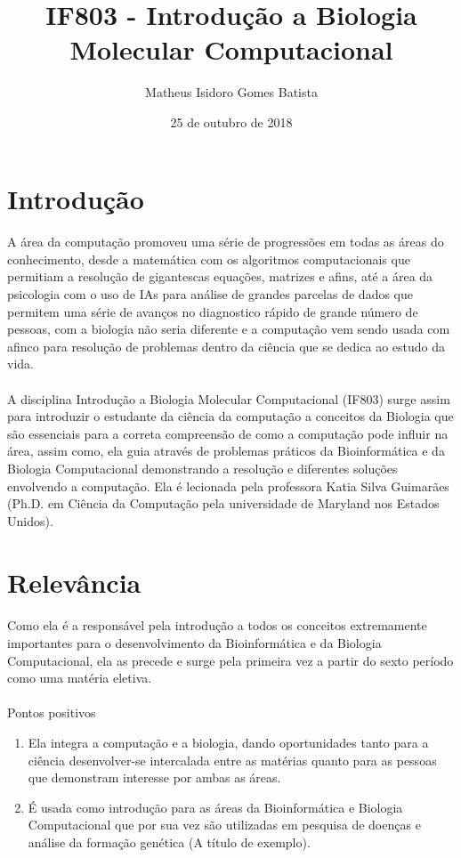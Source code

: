\documentclass[10pt, a4paper]{article}
\title{IF803 - Introdução a Biologia Molecular Computacional}
\author{Matheus Isidoro Gomes Batista}
\date{25 de outubro de 2018}
\begin{document}
\maketitle

\section{Introdução}
\paragraph{}A área da computação promoveu uma série de progressões em todas as áreas do conhecimento, desde a matemática com os algoritmos computacionais que permitiam a resolução de gigantescas equações, matrizes e afins, até a área da psicologia com o uso de IAs para análise de grandes parcelas de dados que permitem uma série de avanços no diagnostico rápido de grande número de pessoas, com a biologia não seria diferente e a computação vem sendo usada com afinco para resolução de problemas dentro da ciência que se dedica ao estudo da vida.
\paragraph{}A disciplina Introdução a Biologia Molecular Computacional (IF803) surge assim para introduzir o estudante da ciência da computação a conceitos da Biologia que são essenciais para a correta compreensão de como a computação pode influir na área, assim como, ela guia através de problemas práticos da Bioinformática e da Biologia Computacional demonstrando a resolução e diferentes soluções envolvendo a computação. Ela é lecionada pela professora Katia Silva Guimarães (Ph.D. em Ciência da Computação pela universidade de Maryland nos Estados Unidos).

\section{Relevância}
\paragraph{}Como ela é a responsável pela introdução a todos os conceitos extremamente importantes para o desenvolvimento da Bioinformática e da Biologia Computacional, ela as precede e surge pela primeira vez a partir do sexto período como uma matéria eletiva.

\paragraph{}Pontos positivos
\begin{enumerate}
\item Ela integra a computação e a biologia, dando oportunidades tanto para a ciência desenvolver-se intercalada entre as matérias quanto para as pessoas que demonstram interesse por ambas as áreas.
\item É usada como introdução para as áreas da Bioinformática e Biologia Computacional que por sua vez são utilizadas em pesquisa de doenças e análise da formação genética (A título de exemplo).
\end{enumerate}
\end{document}
